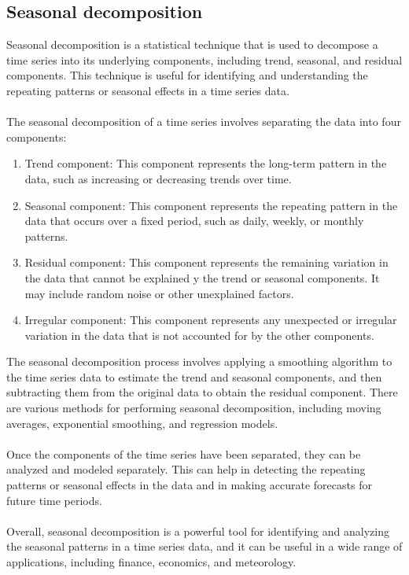         \subsection{Seasonal decomposition}
        Seasonal decomposition is a statistical technique that is used to decompose a time series into its underlying components, including trend,
        seasonal, and residual components. This technique is useful for identifying and understanding the repeating patterns or seasonal
        effects in a time series data.\\
        \\
        The seasonal decomposition of a time series involves separating the data into four components:
        \begin{enumerate}
            \item Trend component: This component represents the long-term pattern in the data, such as increasing or decreasing trends over time.
            \item Seasonal component: This component represents the repeating pattern in the data that occurs over a fixed period,
            such as daily, weekly, or monthly patterns.
            \item Residual component: This component represents the remaining variation in the data that cannot be explained 
            y the trend or seasonal components. It may include random noise or other unexplained factors.
            \item Irregular component: This component represents any unexpected or irregular variation in the data that is not
            accounted for by the other components.
        \end{enumerate}
        The seasonal decomposition process involves applying a smoothing algorithm to the time series data to estimate the trend and
        seasonal components, and then subtracting them from the original data to obtain the residual component.
        There are various methods for performing seasonal decomposition, including moving averages, exponential smoothing, and regression models.\\
        \\
        Once the components of the time series have been separated, they can be analyzed and modeled separately.
        This can help in detecting the repeating patterns or seasonal effects in the data and in making accurate forecasts for future time periods.\\
        \\
        Overall, seasonal decomposition is a powerful tool for identifying and analyzing the seasonal patterns in a time series
        data, and it can be useful in a wide range of applications, including finance, economics, and meteorology.\\

